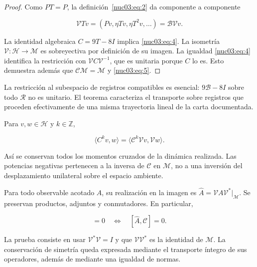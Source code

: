 \begin{proof}
Como \(PT=P\), la definición~\eqref{nuc03:eq:2} da componente a componente

\[
\mathcal VT v=(Pv,\eta Tv,\eta T^2v,\ldots)=\mathcal B\mathcal Vv.
\]

La identidad algebraica \(C=9T-8I\) implica \eqref{nuc03:eq:4}. La isometría \(\mathcal V:\mathcal H\to\mathcal M\) es sobreyectiva por definición de su imagen. La igualdad \eqref{nuc03:eq:4} identifica la restricción con \(\mathcal V C\mathcal V^{-1}\), que es unitaria porque \(C\) lo es. Esto demuestra además que \(\mathcal C\mathcal M=\mathcal M\) y \eqref{nuc03:eq:5}.
\end{proof}

La restricción al subespacio de registros compatibles es esencial: \(9\mathcal B-8I\) sobre todo \(\mathcal R\) no es unitario. El teorema caracteriza el transporte sobre registros que proceden efectivamente de una misma trayectoria lineal de la carta documentada.

\begin{corollary}
Para \(v,w\in\mathcal H\) y \(k\in\mathbb Z\),

\begin{equation}
\langle C^kv,w\rangle
=\langle\mathcal C^k\mathcal Vv,\mathcal Vw\rangle.
\label{nuc03:eq:6}
\end{equation}

Así se conservan todos los momentos cruzados de la dinámica realizada. Las potencias negativas pertenecen a la inversa de \(\mathcal C\) en \(\mathcal M\), no a una inversión del desplazamiento unilateral sobre el espacio ambiente.
\end{corollary}

\begin{corollary}
Para todo observable acotado \(A\), su realización en la imagen es \(\widehat A=\mathcal V A\mathcal V^*|_{\mathcal M}\). Se preservan productos, adjuntos y conmutadores. En particular,

\begin{equation}
[A,C]=0\quad\Longleftrightarrow\quad[\widehat A,\mathcal C]=0.
\label{nuc03:eq:7}
\end{equation}
\end{corollary}

La prueba consiste en usar \(\mathcal V^*\mathcal V=I\) y que \(\mathcal V\mathcal V^*\) es la identidad de \(\mathcal M\). La conservación de simetría queda expresada mediante el transporte íntegro de sus operadores, además de mediante una igualdad de normas.

